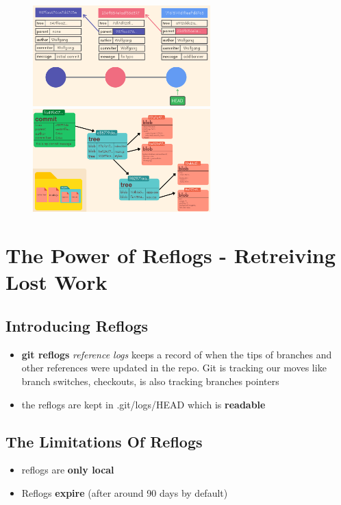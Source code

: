 \documentclass{report}
\newcommand{\warning}{
	{\fontencoding{U}\fontfamily{futs}\selectfont\char 66\relax}
}
\begin{document}
\begin{figure}[H] 
	 \centering 
	 \includegraphics[width=2.7in]{screenshots/2022-07-10T18-43-56Z.png} 
	 \includegraphics[width=2.7in]{screenshots/2022-07-10T18-43-14Z.png} 
\end{figure}


\chapter{The Power of Reflogs - Retreiving Lost Work}

\section{Introducing Reflogs}

\begin{itemize}
	\item \textbf{git reflogs} \textit{reference logs} keeps a record of when the tips of branches and other references were updated in the repo. Git is tracking our moves like branch switches, checkouts, is also tracking branches pointers
	\item the reflogs are kept in .git/logs/HEAD which is \textbf{readable}
\end{itemize}

\section{The Limitations Of Reflogs}

\begin{itemize}
	\item \warning reflogs are \textbf{only local} 
	\item Reflogs \textbf{expire} (after around 90 days by default) 
\end{itemize}
\end{document}
